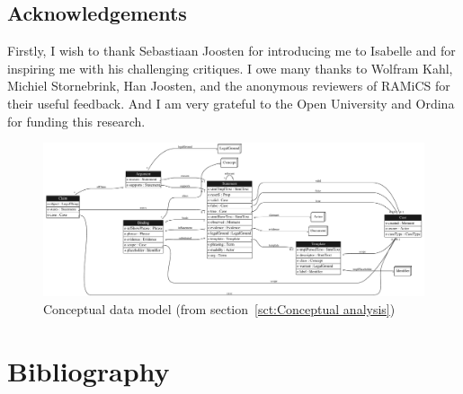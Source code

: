\documentclass{elsarticle}
\begin{document}
\subsection{Acknowledgements}
\label{sct:Acknowledgements}
	Firstly, I wish to thank Sebastiaan Joosten for introducing me to Isabelle and for inspiring me with his challenging critiques.
	I owe many thanks to Wolfram Kahl, Michiel Stornebrink, Han Joosten, and the anonymous reviewers of RAMiCS for their useful feedback.
	And I am very grateful to the Open University and Ordina for funding this research.

\begin{figure}[htb]
\begin{center}
  \includegraphics[angle=90,scale=.357]{LogicalDataModel.pdf}
\end{center}
\caption{Conceptual data model (from section~\ref{sct:Conceptual analysis})}
\label{fig:conceptual model}
\end{figure}

\section{Bibliography}


\end{document}
